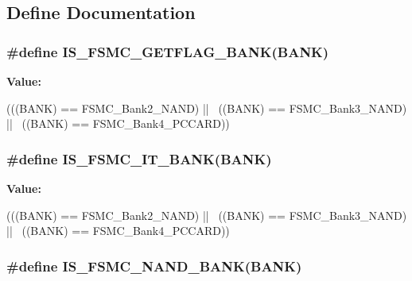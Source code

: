 \subsection{Define Documentation}
\hypertarget{group__FSMC__Exported__Constants_ga884e28a365a738ad8a3199ee279a1f77}{
\subsubsection[{IS\_\-FSMC\_\-GETFLAG\_\-BANK}]{\setlength{\rightskip}{0pt plus 5cm}\#define IS\_\-FSMC\_\-GETFLAG\_\-BANK(BANK)}}
\label{group__FSMC__Exported__Constants_ga884e28a365a738ad8a3199ee279a1f77}
{\bfseries Value:}
\begin{DoxyCode}
(((BANK) == FSMC_Bank2_NAND) || \
                                    ((BANK) == FSMC_Bank3_NAND) || \
                                    ((BANK) == FSMC_Bank4_PCCARD))
\end{DoxyCode}
\hypertarget{group__FSMC__Exported__Constants_gaca216ea0c184b78f23df15296a10bac0}{
\subsubsection[{IS\_\-FSMC\_\-IT\_\-BANK}]{\setlength{\rightskip}{0pt plus 5cm}\#define IS\_\-FSMC\_\-IT\_\-BANK(BANK)}}
\label{group__FSMC__Exported__Constants_gaca216ea0c184b78f23df15296a10bac0}
{\bfseries Value:}
\begin{DoxyCode}
(((BANK) == FSMC_Bank2_NAND) || \
                               ((BANK) == FSMC_Bank3_NAND) || \
                               ((BANK) == FSMC_Bank4_PCCARD))
\end{DoxyCode}
\hypertarget{group__FSMC__Exported__Constants_ga725bada099197f15f49dc0c5be00e19b}{
\subsubsection[{IS\_\-FSMC\_\-NAND\_\-BANK}]{\setlength{\rightskip}{0pt plus 5cm}\#define IS\_\-FSMC\_\-NAND\_\-BANK(BANK)}}
